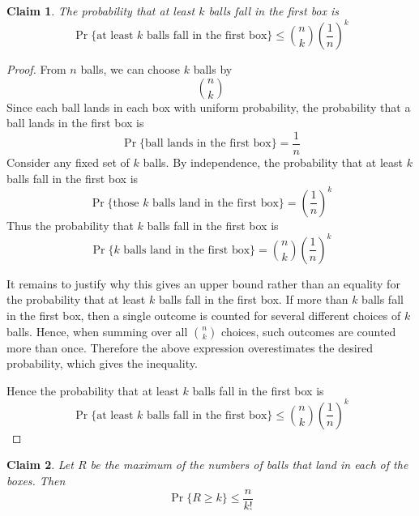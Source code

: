 \documentclass{article}
\newtheorem{claim}{Claim}
\begin{document}
\begin{claim}
    The probability that at least $k$ balls fall in the first box is
    \[
    \Pr\{\text{at least } k \text{ balls fall in the first box}\} \leq \binom{n}{k}\left(\frac{1}{n}\right)^k
    \]
\end{claim}

\begin{proof}
    From $n$ balls, we can choose $k$ balls by
    \[
    \binom{n}{k}
    \]
    Since each ball lands in each box with uniform probability, the probability that a ball lands in the first 
    box is
    \[
    \Pr\{\text{ball lands in the first box}\} = \frac{1}{n}
    \]
    Consider any fixed set of $k$ balls. By independence, the probability that at least $k$ balls fall in the 
    first box is
    \[
    \Pr\{\text{those } k \text{ balls land in the first box}\} = \left(\frac{1}{n}\right)^k
    \]
    Thus the probability that $k$ balls fall in the first box is
    \[
    \Pr\{k \text{ balls land in the first box}\} = \binom{n}{k}\left(\frac{1}{n}\right)^k
    \]

    \medskip

    It remains to justify why this gives an upper bound rather than an equality for the probability that at 
    least $k$ balls fall in the first box. If more than $k$ balls fall in the first box, then a single outcome 
    is counted for several different choices of $k$ balls. Hence, when summing over all $\binom{n}{k}$ choices, 
    such outcomes are counted more than once. Therefore the above expression overestimates the desired 
    probability, which gives the inequality.

    \medskip

    Hence the probability that at least $k$ balls fall in the first box is
    \[
    \Pr\{\text{at least } k \text{ balls fall in the first box}\} \leq \binom{n}{k}\left(\frac{1}{n}\right)^k
    \]
\end{proof}

\begin{claim}
    Let $R$ be the maximum of the numbers of balls that land in each of the boxes. Then 
    \[
    \Pr\{R \geq k\} \leq \frac{n}{k!}
    \]
\end{claim}
\end{document}
